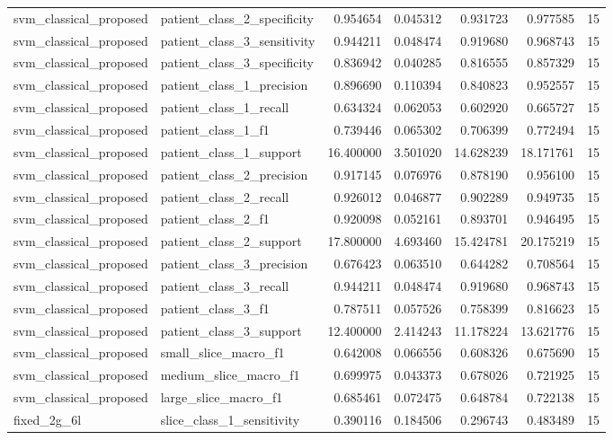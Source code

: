 \begin{tabular}{llrrrrr}
svm_classical_proposed & patient_class_2_specificity & 0.954654 & 0.045312 & 0.931723 & 0.977585 & 15 \\
svm_classical_proposed & patient_class_3_sensitivity & 0.944211 & 0.048474 & 0.919680 & 0.968743 & 15 \\
svm_classical_proposed & patient_class_3_specificity & 0.836942 & 0.040285 & 0.816555 & 0.857329 & 15 \\
svm_classical_proposed & patient_class_1_precision & 0.896690 & 0.110394 & 0.840823 & 0.952557 & 15 \\
svm_classical_proposed & patient_class_1_recall & 0.634324 & 0.062053 & 0.602920 & 0.665727 & 15 \\
svm_classical_proposed & patient_class_1_f1 & 0.739446 & 0.065302 & 0.706399 & 0.772494 & 15 \\
svm_classical_proposed & patient_class_1_support & 16.400000 & 3.501020 & 14.628239 & 18.171761 & 15 \\
svm_classical_proposed & patient_class_2_precision & 0.917145 & 0.076976 & 0.878190 & 0.956100 & 15 \\
svm_classical_proposed & patient_class_2_recall & 0.926012 & 0.046877 & 0.902289 & 0.949735 & 15 \\
svm_classical_proposed & patient_class_2_f1 & 0.920098 & 0.052161 & 0.893701 & 0.946495 & 15 \\
svm_classical_proposed & patient_class_2_support & 17.800000 & 4.693460 & 15.424781 & 20.175219 & 15 \\
svm_classical_proposed & patient_class_3_precision & 0.676423 & 0.063510 & 0.644282 & 0.708564 & 15 \\
svm_classical_proposed & patient_class_3_recall & 0.944211 & 0.048474 & 0.919680 & 0.968743 & 15 \\
svm_classical_proposed & patient_class_3_f1 & 0.787511 & 0.057526 & 0.758399 & 0.816623 & 15 \\
svm_classical_proposed & patient_class_3_support & 12.400000 & 2.414243 & 11.178224 & 13.621776 & 15 \\
svm_classical_proposed & small_slice_macro_f1 & 0.642008 & 0.066556 & 0.608326 & 0.675690 & 15 \\
svm_classical_proposed & medium_slice_macro_f1 & 0.699975 & 0.043373 & 0.678026 & 0.721925 & 15 \\
svm_classical_proposed & large_slice_macro_f1 & 0.685461 & 0.072475 & 0.648784 & 0.722138 & 15 \\
fixed_2g_6l & slice_class_1_sensitivity & 0.390116 & 0.184506 & 0.296743 & 0.483489 & 15 \\

\end{tabular}
